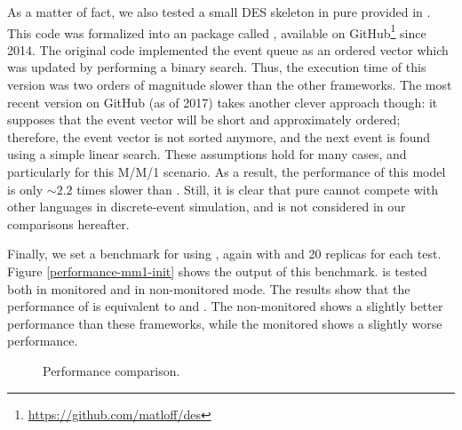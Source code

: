 \documentclass[
  nojss]{jss}
\begin{document}
As a matter of fact, we also tested a small DES skeleton in pure
 provided in \citep[\emph{7.8.3 Extended Example:
Discrete-Event Simulation in }]{Matloff:2011:ARP:2090080}.
This code was formalized into an  package called ,
available on GitHub\footnote{\url{https://github.com/matloff/des}} since
2014. The original code implemented the event queue as an ordered vector
which was updated by performing a binary search. Thus, the execution
time of this version was two orders of magnitude slower than the other
frameworks. The most recent version on GitHub (as of 2017) takes another
clever approach though: it supposes that the event vector will be short
and approximately ordered; therefore, the event vector is not sorted
anymore, and the next event is found using a simple linear search. These
assumptions hold for many cases, and particularly for this M/M/1
scenario. As a result, the performance of this model is only \(\sim2.2\)
times slower than . Still, it is clear that pure 
cannot compete with other languages in discrete-event simulation, and
 is not considered in our comparisons hereafter.

Finally, we set a benchmark for  using ,
again with  and 20 replicas for each test. Figure
\ref{performance-mm1-init} shows the output of this benchmark.
 is tested both in monitored and in non-monitored mode. The
results show that the performance of  is equivalent to
 and . The non-monitored  shows a
slightly better performance than these frameworks, while the monitored
 shows a slightly worse performance.

\begin{CodeChunk}
\begin{figure}

{\centering {}

}

\caption[Performance comparison]{Performance comparison.}\label{fig:performance-mm1-plot}
\end{figure}
\end{CodeChunk}
\end{document}
